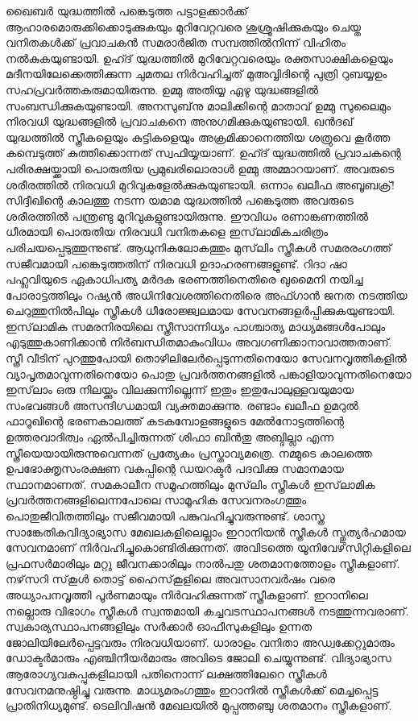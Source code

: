 ഖൈബര്‍ യുദ്ധത്തില്‍ പങ്കെടുത്ത പട്ടാളക്കാര്‍ക്ക് ആഹാരമൊരുക്കിക്കൊടുക്കുകയും മുറിവേറ്റവരെ ശുശ്രൂഷിക്കുകയും ചെയ്ത വനിതകള്‍ക്ക് പ്രവാചകന്‍ സമരാര്‍ജിത സമ്പത്തില്‍നിന്ന് വിഹിതം നല്‍കുകയുണ്ടായി. ഉഹ്ദ് യുദ്ധത്തില്‍ മുറിവേറ്റവരെയും രക്തസാക്ഷികളെയും മദീനയിലേക്കെത്തിക്കുന്ന ചുമതല നിര്‍വഹിച്ചത് മുഅവ്വിദിന്റെ പുത്രി റുബയ്യഉം സഹപ്രവര്‍ത്തകരുമായിരുന്നു. ഉമ്മു അതിയ്യ ഏഴു യുദ്ധങ്ങളില്‍ സംബന്ധിക്കുകയുണ്ടായി. അനസുബ്‌നു മാലിക്കിന്റെ മാതാവ് ഉമ്മു സുലൈമും നിരവധി യുദ്ധങ്ങളില്‍ പ്രവാചകനെ അനുഗമിക്കുകയുണ്ടായി. ഖന്‍ദഖ് യുദ്ധത്തില്‍ സ്ത്രീകളെയും കുട്ടികളെയും അക്രമിക്കാനെത്തിയ ശത്രുവെ കൂര്‍ത്ത കമ്പെടുത്ത് കുത്തിക്കൊന്നത് സ്വഫിയ്യയാണ്. ഉഹ്ദ് യുദ്ധത്തില്‍ പ്രവാചകന്റെ പരിരക്ഷയ്ക്കായി പൊരുതിയ പ്രമുഖരിലൊരാള്‍ ഉമ്മു അമ്മാറയാണ്. അവരുടെ ശരീരത്തില്‍ നിരവധി മുറിവുകളേല്‍ക്കുകയുണ്ടായി. ഒന്നാം ഖലീഫ അബൂബക്ര്! സിദ്ദീഖിന്റെ കാലത്തു നടന്ന യമാമ യുദ്ധത്തില്‍ പങ്കെടുത്ത അവരുടെ ശരീരത്തില്‍ പന്ത്രണ്ടു മുറിവുകളുണ്ടായിരുന്നു. ഈവിധം രണാങ്കണത്തില്‍ ധീരമായി പൊരുതിയ നിരവധി വനിതകളെ ഇസ്‌ലാമികചരിത്രം പരിചയപ്പെടുത്തുന്നുണ്ട്.
ആധുനികലോകത്തും മുസ്‌ലിം സ്ത്രീകള്‍ സമരരംഗത്ത് സജീവമായി പങ്കെടുത്തതിന് നിരവധി ഉദാഹരണങ്ങളുണ്ട്. റിദാ ഷാ പഹ്ലവിയുടെ ഏകാധിപത്യ മര്‍ദക ഭരണത്തിനെതിരെ ഖുമൈനി നയിച്ച പോരാട്ടത്തിലും റഷ്യന്‍ അധിനിവേശത്തിനെതിരെ അഫ്ഗാന്‍ ജനത നടത്തിയ ചെറുത്തുനില്‍പിലും സ്ത്രീകള്‍ ധീരോജ്ജ്വലമായ സേവനങ്ങളര്‍പ്പിക്കുകയുണ്ടായി. ഇസ്‌ലാമിക സമരനിരയിലെ സ്ത്രീസാന്നിധ്യം പാശ്ചാത്യ മാധ്യമങ്ങള്‍പോലും എടുത്തുകാണിക്കാന്‍ നിര്‍ബന്ധിതമാകുംവിധം അവഗണിക്കാനാവാത്തതാണ്.
സ്ത്രീ വീടിന് പുറത്തുപോയി തൊഴിലിലേര്‍പ്പെടുന്നതിനെയോ സേവനവൃത്തികളില്‍ വ്യാപൃതമാവുന്നതിനെയോ പൊതു പ്രവര്‍ത്തനങ്ങളില്‍ പങ്കാളിയാവുന്നതിനെയോ ഇസ്‌ലാം ഒരു നിലയ്ക്കും വിലക്കുന്നില്ലെന്ന് ഇതും ഇതുപോലുള്ളവയുമായ സംഭവങ്ങള്‍ അസന്ദിഗ്ധമായി വ്യക്തമാക്കുന്നു. രണ്ടാം ഖലീഫ ഉമറുല്‍ ഫാറൂഖിന്റെ ഭരണകാലത്ത് കടകമ്പോളങ്ങളുടെ മേല്‍നോട്ടത്തിന്റെ ഉത്തരവാദിത്വം ഏല്‍പിച്ചിരുന്നത് ശിഫാ ബിന്‍തു അബ്ദില്ലാ എന്ന സ്ത്രീയെയായിരുന്നുവെന്നത് പ്രത്യേകം പ്രസ്താവ്യമത്രെ. നമ്മുടെ കാലത്തെ ഉപഭോക്തൃസംരക്ഷണ വകുപ്പിന്റെ ഡയറക്ടര്‍ പദവിക്കു സമാനമായ സ്ഥാനമാണത്.
സമകാലീന സമൂഹത്തിലും മുസ്‌ലിം സ്ത്രീകള്‍ ഇസ്‌ലാമിക പ്രവര്‍ത്തനങ്ങളിലെന്നപോലെ സാമൂഹിക സേവനരംഗത്തും പൊതുജീവിതത്തിലും സജീവമായി പങ്കുവഹിച്ചുവരുന്നുണ്ട്. ശാസ്ത്ര സാങ്കേതികവിദ്യാഭ്യാസ മേഖലകളിലെല്ലാം ഇറാനിയന്‍ സ്ത്രീകള്‍ സ്തുത്യര്‍ഹമായ സേവനമാണ് നിര്‍വഹിച്ചുകൊണ്ടിരിക്കുന്നത്. അവിടത്തെ യൂനിവേഴ്‌സിറ്റികളിലെ പ്രഫസര്‍മാരിലും മറ്റു ജീവനക്കാരിലും നാല്‍പതു ശതമാനത്തോളം സ്ത്രീകളാണ്. നഴ്‌സറി സ്‌കൂള്‍ തൊട്ട് ഹൈസ്‌കൂളിലെ അവസാനവര്‍ഷം വരെ അധ്യാപനവൃത്തി പൂര്‍ണമായും നിര്‍വഹിക്കുന്നത് സ്ത്രീകളാണ്. ഇറാനിലെ നല്ലൊരു വിഭാഗം സ്ത്രീകള്‍ സ്വന്തമായി കച്ചവടസ്ഥാപനങ്ങള്‍ നടത്തുന്നവരാണ്. സ്വകാര്യസ്ഥാപനങ്ങളിലും സര്‍ക്കാര്‍ ഓഫീസുകളിലും ഉന്നത ജോലിയിലേര്‍പ്പെട്ടവരും നിരവധിയാണ്. ധാരാളം വനിതാ അഡ്വക്കേറ്റുമാരും ഡോക്ടര്‍മാരും എഞ്ചിനീയര്‍മാരും അവിടെ ജോലി ചെയ്യുന്നുണ്ട്. വിദ്യാഭ്യാസ ആരോഗ്യവകുപ്പുകളിലായി പതിനൊന്ന് ലക്ഷത്തിലേറെ സ്ത്രീകള്‍ സേവനമനുഷ്ഠിച്ചു വരുന്നു. മാധ്യമരംഗത്തും ഇറാനില്‍ സ്ത്രീകള്‍ക്ക് മെച്ചപ്പെട്ട പ്രാതിനിധ്യമുണ്ട്. ടെലിവിഷന്‍ മേഖലയില്‍ മുപ്പത്തഞ്ചു ശതമാനം സ്ത്രീകളാണ്.
